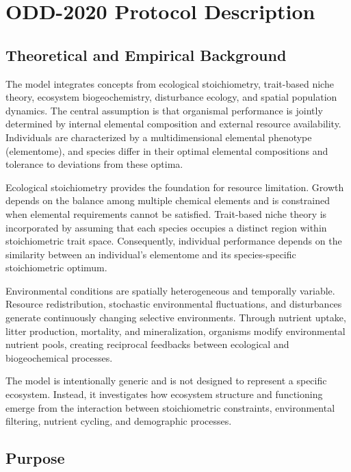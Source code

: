 

\section{ODD-2020 Protocol Description}

\subsection{Theoretical and Empirical Background}

The model integrates concepts from ecological stoichiometry, trait-based niche theory, ecosystem biogeochemistry, disturbance ecology, and spatial population dynamics. The central assumption is that organismal performance is jointly determined by internal elemental composition and external resource availability. Individuals are characterized by a multidimensional elemental phenotype (elementome), and species differ in their optimal elemental compositions and tolerance to deviations from these optima.

Ecological stoichiometry provides the foundation for resource limitation. Growth depends on the balance among multiple chemical elements and is constrained when elemental requirements cannot be satisfied. Trait-based niche theory is incorporated by assuming that each species occupies a distinct region within stoichiometric trait space. Consequently, individual performance depends on the similarity between an individual's elementome and its species-specific stoichiometric optimum.

Environmental conditions are spatially heterogeneous and temporally variable. Resource redistribution, stochastic environmental fluctuations, and disturbances generate continuously changing selective environments. Through nutrient uptake, litter production, mortality, and mineralization, organisms modify environmental nutrient pools, creating reciprocal feedbacks between ecological and biogeochemical processes.

The model is intentionally generic and is not designed to represent a specific ecosystem. Instead, it investigates how ecosystem structure and functioning emerge from the interaction between stoichiometric constraints, environmental filtering, nutrient cycling, and demographic processes.

\subsection{Purpose}


